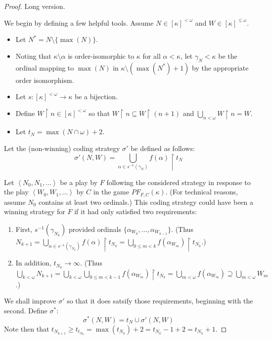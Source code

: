 \documentclass[11pt]{article}
\theoremstyle{plain}
\theoremstyle{definition}
\theoremstyle{remark}
\begin{document}
\begin{proof}
Long version.

We begin by defining a few helpful tools. Assume $N\in[\kappa]^{<\omega}$ and $W \in [\kappa]^{\leq\omega}$.
    \begin{itemize}
    \item Let $N^* = N \setminus \{\max(N)\}$.
    \item Noting that $\kappa\setminus \alpha$ is order-isomorphic to $\kappa$ for all $\alpha<\kappa$, let $\gamma_N<\kappa$ be the ordinal mapping to $\max(N)$ in $\kappa\setminus(\max(N^*)+1)$ by the appropriate order isomorphism.
    \item Let $s: [\kappa]^{<\omega} \to \kappa$ be a bijection.
    \item Define $W\restriction n \in [\kappa]^{<\omega}$ so that $W\restriction n \subseteq W\restriction (n+1)$ and $\bigcup_{n<\omega}W\restriction n = W$.
    \item Let $t_N=\max(N\cap\omega)+2$.
    \end{itemize}

Let the (non-winning) coding strategy $\sigma'$ be defined as follows: \[\sigma'(N,W)=\bigcup_{\alpha \in s^{-1}(\gamma_N)} f(\alpha) \restriction t_N\]

Let $\left<N_0,N_1,\dots\right>$ be a play by $F$ following the considered strategy in response to the play $\left<W_0,W_1,\dots\right>$ by $C$ in the game $PF_{F,C}(\kappa)$. (For technical reasons, assume $N_0$ contains at least two ordinals.) This coding strategy could have been a winning strategy for $F$ if it had only satisfied two requirements:

    \begin{enumerate}
    \item First, $s^{-1}(\gamma_{N_k})$ provided ordinals $\{\alpha_{W_0},\dots,\alpha_{W_{k-1}}\}$. (Thus $N_{k+1}=\bigcup_{\alpha \in s^{-1}(\gamma_{N_k})} f(\alpha) \restriction t_{N_k} = \bigcup_{0\leq m < k} f(\alpha_{W_m}) \restriction t_{N_k}$.)
    \item In addition, $t_{N_k} \to \infty$. (Thus $\bigcup_{k<\omega} N_{k+1} = \bigcup_{k<\omega}\bigcup_{0\leq m < k-1} f(\alpha_{W_m}) \restriction t_{N_k} = \bigcup_{m<\omega} f(\alpha_{W_m}) \supseteq \bigcup_{m<\omega} W_m$.)
    \end{enumerate}

We shall improve $\sigma'$ so that it does satsify those requirements, beginning with the second.  Define $\sigma^*$: \[\sigma^*(N,W)=t_N \cup \sigma'(N,W)\] Note then that $t_{N_{k+1}}\geq t_{t_{N_k}} = \max(t_{N_k})+2 = t_{N_k}-1+2=t_{N_k}+1$.


\end{proof}
\end{document}
